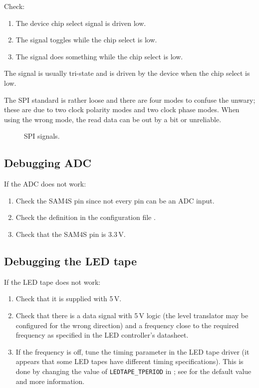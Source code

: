 Check:
%
\begin{enumerate}
\item The device chip select signal is driven low.
\item The  signal toggles while the chip select is low.
\item The  signal does something while the chip select is low.
\end{enumerate}
%
The  signal is usually tri-state and is driven by the
device when the chip select is low.

The SPI standard is rather loose and there are four modes to confuse
the unwary; these are due to two clock polarity modes and two clock
phase modes.  When using the wrong mode, the read data can be out by a
bit or unreliable.

\begin{figure}[!h]
  \centering
  \caption{SPI signals.}
\end{figure}


\subsection{Debugging ADC}
\label{debugging-adc}

If the ADC does not work:
%
\begin{enumerate}
\item
  Check the SAM4S pin since not every pin can be an ADC input.

\item
  Check the definition in the configuration file .

\item
  Check that the SAM4S  pin is 3.3\,V.

\end{enumerate}


\subsection{Debugging the LED tape}

If the LED tape does not work:
%
\begin{enumerate}
\item Check that it is supplied with 5\,V.

\item Check that there is a data signal with 5\,V logic (the level
  translator may be configured for the wrong direction) and a
  frequency close to the required frequency as specified in the LED
  controller's datasheet.

\item If the frequency is off, tune the timing parameter in the LED
  tape driver (it appears that some LED tapes have different timing
  specifications). This is done by changing the value of
  \verb|LEDTAPE_TPERIOD| in ; see
   for the default value and more
  information.
\end{enumerate}


